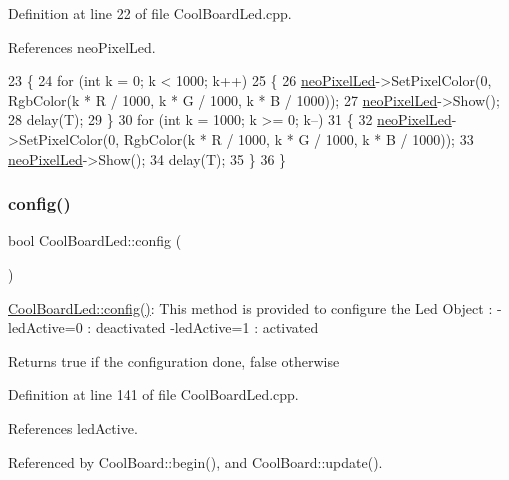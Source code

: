 Definition at line 22 of file Cool\+Board\+Led.\+cpp.



References neo\+Pixel\+Led.


\begin{DoxyCode}
23 \{
24     \textcolor{keywordflow}{for} (\textcolor{keywordtype}{int} k = 0; k < 1000; k++) 
25     \{
26         \hyperlink{classCoolBoardLed_ac2c13fa462a010cd9242bf297c013923}{neoPixelLed}->SetPixelColor(0, RgbColor(k * R / 1000, k * G / 1000, k * B / 1000));
27         \hyperlink{classCoolBoardLed_ac2c13fa462a010cd9242bf297c013923}{neoPixelLed}->Show();
28         delay(T);
29     \}
30     \textcolor{keywordflow}{for} (\textcolor{keywordtype}{int} k = 1000; k >= 0; k--) 
31     \{
32         \hyperlink{classCoolBoardLed_ac2c13fa462a010cd9242bf297c013923}{neoPixelLed}->SetPixelColor(0, RgbColor(k * R / 1000, k * G / 1000, k * B / 1000));
33         \hyperlink{classCoolBoardLed_ac2c13fa462a010cd9242bf297c013923}{neoPixelLed}->Show();
34         delay(T);
35     \}
36 \}
\end{DoxyCode}
\mbox{\label{classCoolBoardLed_a1b60e5e30bea96c49ed62ed1bf1ffc8b}} 
\subsubsection{\texorpdfstring{config()}{config()}}
{\footnotesize\ttfamily bool Cool\+Board\+Led\+::config (\begin{DoxyParamCaption}{ }\end{DoxyParamCaption})}

\hyperlink{classCoolBoardLed_a1b60e5e30bea96c49ed62ed1bf1ffc8b}{Cool\+Board\+Led\+::config()}\+: This method is provided to configure the Led Object \+: -\/led\+Active=0 \+: deactivated -\/led\+Active=1 \+: activated \begin{DoxyReturn}{Returns}
true if the configuration done, false otherwise 
\end{DoxyReturn}


Definition at line 141 of file Cool\+Board\+Led.\+cpp.



References led\+Active.



Referenced by Cool\+Board\+::begin(), and Cool\+Board\+::update().


